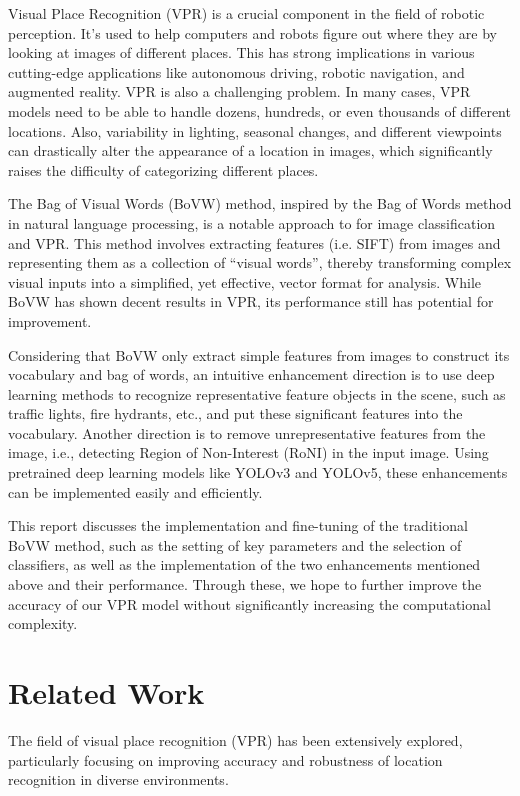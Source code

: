 \documentclass[conference]{IEEEtran}
\begin{document}
Visual Place Recognition (VPR) is a crucial component in the field of robotic perception. It's used to help computers and robots figure out where they are by looking at images of different places. This has strong implications in various cutting-edge applications like autonomous driving, robotic navigation, and augmented reality. VPR is also a challenging problem. In many cases, VPR models need to be able to handle dozens, hundreds, or even thousands of different locations. Also, variability in lighting, seasonal changes, and different viewpoints can drastically alter the appearance of a location in images, which significantly raises the difficulty of categorizing different places.

The Bag of Visual Words (BoVW) method, inspired by the Bag of Words method in natural language processing, is a notable approach to for image classification\cite{yang2010bag} and VPR. This method involves extracting features (i.e. SIFT) from images and representing them as a collection of ``visual words'', thereby transforming complex visual inputs into a simplified, yet effective, vector format for analysis. While BoVW has shown decent results in VPR, its performance still has potential for improvement. 

Considering that BoVW only extract simple features from images to construct its vocabulary and bag of words, an intuitive enhancement direction is to use deep learning methods to recognize representative feature objects in the scene, such as traffic lights, fire hydrants, etc., and put these significant features into the vocabulary. Another direction is to remove unrepresentative features from the image, i.e., detecting Region of Non-Interest (RoNI) in the input image. Using pretrained deep learning models like YOLOv3\cite{redmon2018yolov3} and YOLOv5, these enhancements can be implemented easily and efficiently.

This report discusses the implementation and fine-tuning of the traditional BoVW method, such as the setting of key parameters and the selection of classifiers, as well as the implementation of the two enhancements mentioned above and their performance. Through these, we hope to further improve the accuracy of our VPR model without significantly increasing the computational complexity.

\section{Related Work}

The field of visual place recognition (VPR) has been extensively explored, particularly focusing on improving accuracy and robustness of location recognition in diverse environments.
\end{document}
